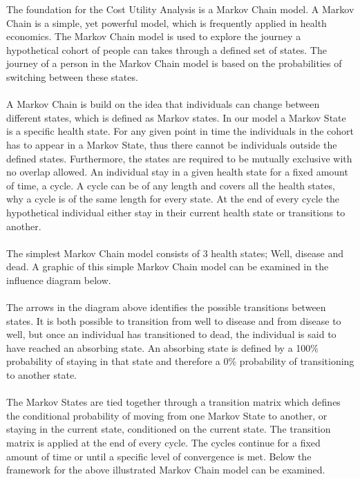 \documentclass[a4paper,12pt]{article}
\begin{document}
The foundation for the Cost Utility Analysis is a Markov Chain model. A Markov Chain is a simple, yet powerful model, which is frequently applied in health economics. The Markov Chain model is used to explore the journey a hypothetical cohort of people can takes through a defined set of states. The journey of a person in the Markov Chain model is based on the probabilities of switching between these states.
\\\\
A Markov Chain is build on the idea that individuals can change between different states, which is defined as Markov states. In our model a Markov State is a specific health state. For any given point in time the individuals in the cohort has to appear in a Markov State, thus there cannot be individuals outside the defined states. Furthermore, the states are required to be mutually exclusive with no overlap allowed. An individual stay in a given health state for a fixed amount of time, a cycle. A cycle can be of any length and covers all the health states, why a cycle is of the same length for every state. At the end of every cycle the hypothetical individual either stay in their current health state or transitions to another.
\\\\
The simplest Markov Chain model consists of 3 health states; Well, disease and dead. A graphic of this simple Markov Chain model can be examined in the influence diagram below.
\\\\
The arrows in the diagram above identifies the possible transitions between states. It is both possible to transition from well to disease and from disease to well, but once an individual has transitioned to dead, the individual is said to have reached an absorbing state. An absorbing state is defined by a 100\% probability of staying in that state and therefore a 0\% probability of transitioning to another state. 
\\\\
The Markov States are tied together through a transition matrix which defines the conditional probability of moving from one Markov State to another, or staying in the current state, conditioned on the current state. The transition matrix is applied at the end of every cycle. The cycles continue for a fixed amount of time or until a specific level of convergence is met. Below the framework for the above illustrated Markov Chain model can be examined.
\end{document}
